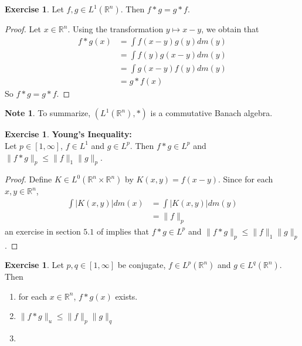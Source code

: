 \documentclass{book}
\theoremstyle{definition}
\newtheorem{note}[definition]{Note}
\newtheorem{ex}[definition]{Exercise}
\newcommand{\R}{\mathbb{R}}
\newcommand{\lex}[1]{\label{ex:#1}}
\DeclareMathOperator*{\0}{\mbf{0}}
\DeclareMathOperator*{\1}{\mbf{1}}
\begin{document}
	\begin{ex}
	\lex{203}Let $f, g \in L^1(\R^n)$. Then $f * g = g* f$. 
	\end{ex}	
	
	\begin{proof}
	Let $x \in \R^n$. Using the transformation $y \mapsto x-y$, we obtain that 
	\begin{align*}
	f*g(x)
	&= \int f(x-y) g(y) dm(y) \\
	&= \int f(y) g(x-y) dm(y) \\
	&= \int g(x-y) f(y) dm(y) \\
	&= g *f(x)
	\end{align*}
	So $f * g = g* f$.
	\end{proof}
	
	\begin{note}
	To summarize, $(L^1(\R^n), *)$ is a commutative Banach algebra.
	\end{note}
	
	
	\begin{ex} \textbf{Young's Inequality:} \\
	\lex{204} Let $p \in [1,\infty]$, $f \in L^1$ and $g \in L^p$. Then $f*g \in L^p$ and $\|f *g\|_p \leq \|f\|_1\|g\|_p$. 
	\end{ex}
	
	\begin{proof}
	Define $K \in L^0(\R^n \times \R^n)$ by $K(x,y) = f(x-y)$. Since for each $x,y \in \R^n$, 
	\begin{align*}
	\int|K(x,y)|dm(x) 
	&= \int|K(x,y)|dm(y) \\
	&= \|f\|_p
	\end{align*} 
	an exercise in section $5.1$ of 
	\cite{measure}
	implies that $f*g \in L^p$ and $\|f *g\|_p \leq \|f\|_1\|g\|_p$.
	\end{proof}
	
	\begin{ex}
	\lex{205} Let $p, q \in [1, \infty]$ be conjugate, $f \in L^p(\R^n)$ and $g \in L^q(\R^n)$. Then 
	\begin{enumerate}
	\item for each $x \in \R^n$, $f * g(x)$ exists. 
	\item $\|f*g\|_u \leq \|f\|_p \|g\|_q $
	\item 
	\end{enumerate}
	\end{ex}
	
\end{document}
